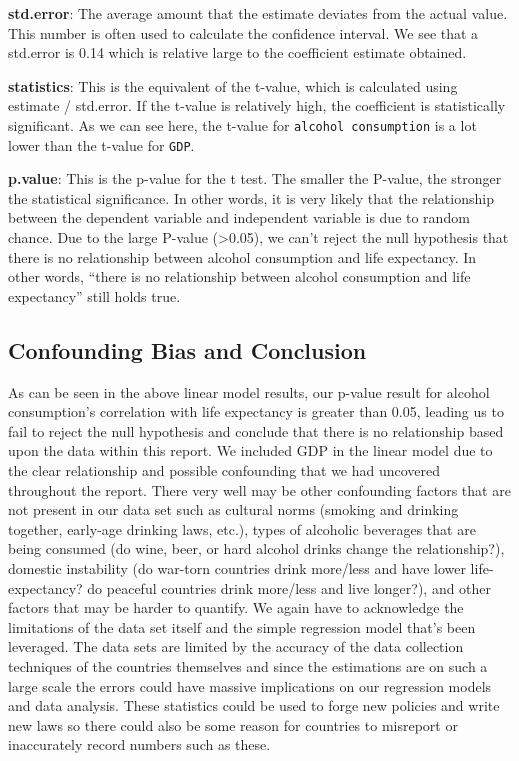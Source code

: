 \documentclass[
]{article}
\begin{document}
\textbf{std.error}: The average amount that the estimate deviates from
the actual value. This number is often used to calculate the confidence
interval. We see that a std.error is 0.14 which is relative large to the
coefficient estimate obtained.

\textbf{statistics}: This is the equivalent of the t-value, which is
calculated using estimate / std.error. If the t-value is relatively
high, the coefficient is statistically significant. As we can see here,
the t-value for \texttt{alcohol\ consumption} is a lot lower than the
t-value for \texttt{GDP}.

\textbf{p.value}: This is the p-value for the t test. The smaller the
P-value, the stronger the statistical significance. In other words, it
is very likely that the relationship between the dependent variable and
independent variable is due to random chance. Due to the large P-value
(\textgreater0.05), we can't reject the null hypothesis that there is no
relationship between alcohol consumption and life expectancy. In other
words, ``there is no relationship between alcohol consumption and life
expectancy'' still holds true.

\hypertarget{confounding-bias-and-conclusion}{%
\subsection{Confounding Bias and
Conclusion}\label{confounding-bias-and-conclusion}}

As can be seen in the above linear model results, our p-value result for
alcohol consumption's correlation with life expectancy is greater than
0.05, leading us to fail to reject the null hypothesis and conclude that
there is no relationship based upon the data within this report. We
included GDP in the linear model due to the clear relationship and
possible confounding that we had uncovered throughout the report. There
very well may be other confounding factors that are not present in our
data set such as cultural norms (smoking and drinking together,
early-age drinking laws, etc.), types of alcoholic beverages that are
being consumed (do wine, beer, or hard alcohol drinks change the
relationship?), domestic instability (do war-torn countries drink
more/less and have lower life-expectancy? do peaceful countries drink
more/less and live longer?), and other factors that may be harder to
quantify. We again have to acknowledge the limitations of the data set
itself and the simple regression model that's been leveraged. The data
sets are limited by the accuracy of the data collection techniques of
the countries themselves and since the estimations are on such a large
scale the errors could have massive implications on our regression
models and data analysis. These statistics could be used to forge new
policies and write new laws so there could also be some reason for
countries to misreport or inaccurately record numbers such as these.
\end{document}

